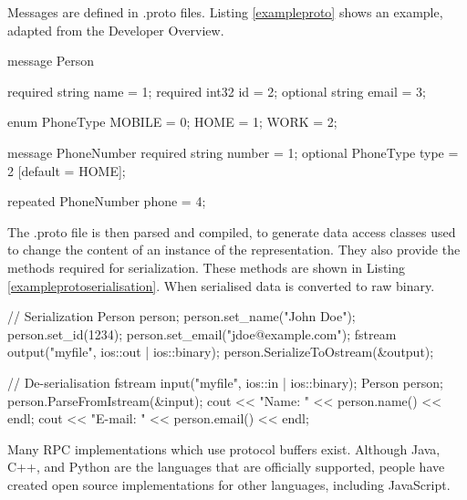 \begin{description}
	Messages are defined in .proto files. Listing \ref{exampleproto} shows an example, adapted from the Developer Overview.
	~\\

	\begin{code}
message Person {
  required string name = 1;
  required int32 id = 2;
  optional string email = 3;

  enum PhoneType {
    MOBILE = 0;
    HOME = 1;
    WORK = 2;
  }

  message PhoneNumber {
    required string number = 1;
    optional PhoneType type = 2 [default = HOME];
  }

  repeated PhoneNumber phone = 4;
}
	\end{code}

	The .proto file is then parsed and compiled, to generate data access classes used to change the content of an instance of the representation. They also provide the methods required for serialization. These methods are shown in Listing \ref{exampleprotoserialisation}. When serialised data is converted to raw binary.

	\begin{code}
// Serialization
Person person;
person.set_name("John Doe");
person.set_id(1234);
person.set_email("jdoe@example.com");
fstream output("myfile", ios::out | ios::binary);
person.SerializeToOstream(&output);

// De-serialisation 
fstream input("myfile", ios::in | ios::binary);
Person person;
person.ParseFromIstream(&input);
cout << "Name: " << person.name() << endl;
cout << "E-mail: " << person.email() << endl;
	\end{code}


	Many RPC implementations which use protocol buffers exist. Although Java, C++, and Python are the languages that are officially supported, people have created open source  implementations for other languages, including JavaScript\cite{protobufjs}.
\end{description}


